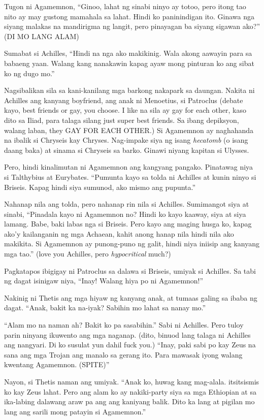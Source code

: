 \documentclass[12pt,letterpaper]{report}
\begin{document}
Tugon ni Agamemnon, ``Ginoo, lahat ng sinabi ninyo ay totoo, pero itong tao nito ay may gustong mamahala sa lahat. Hindi ko paninindigan ito. Ginawa nga siyang malakas na mandirigma ng langit, pero pinayagan ba siyang sigawan ako?'' (DI MO LANG ALAM)

Sumabat si Achilles, ``Hindi na nga ako makikinig. Wala akong aawayin para sa babaeng yaan. Walang kang nanakawin kapag ayaw mong pinturan ko ang sibat ko ng dugo mo.''

Nagsibalikan sila sa kani-kanilang mga barkong nakapark sa daungan. Nakita ni Achilles ang kanyang boyfriend, ang anak ni Menoetius, si Patroclus (debate kayo, best friends or gay, you choose. I like na sila ay gay for each other, kaso dito sa Iliad, para talaga silang just super best friends. Sa ibang depiksyon, walang laban, they GAY FOR EACH OTHER.) Si Agamemnon ay naghahanda na ibalik si Chryseis kay Chryses. Nag-impake siya ng isang \textit{hecatomb} (o isang daang baka) at sinama si Chryseis sa barko. Ginawi niyang kapitan si Ulysses.

Pero, hindi kinalimutan ni Agamemnon ang kangyang pangako. Pinatawag niya si Talthybius at Eurybates. ``Pumunta kayo sa tolda ni Achilles at kunin ninyo si Briseis. Kapag hindi siya sumunod, ako mismo ang pupunta.''

Nahanap nila ang tolda, pero nahanap rin nila si Achilles. Sumimangot siya at sinabi, ``Pinadala kayo ni Agamemnon no? Hindi ko kayo kaaway, siya at siya lamang. Babe, baki labas nga si Briseis. Pero kayo ang maging husga ko, kapag ako'y kailanganin ng mga Achaean, kahit anong hanap nila hindi nila ako makikita. Si Agamemnon ay punong-puno ng galit, hindi niya iniisip ang kanyang mga tao.'' (love you Achilles, pero \textit{hypocritical} much?)

Pagkatapos ibigigay ni Patroclus sa dalawa si Briseis, umiyak si Achilles. Sa tabi ng dagat isinigaw niya, ``Inay! Walang hiya po ni Agamemnon!''

Nakinig ni Thetis ang mga hiyaw ng kanyang anak, at tumaas galing sa ibaba ng dagat. ``Anak, bakit ka na-iyak? Sabihin mo lahat sa nanay mo.''

``Alam mo na naman ah? Bakit ko pa sasabihin.'' Sabi ni Achilles. Pero tuloy parin ninyang ikuwento ang mga naganap. (dito, binuod lang talaga ni Achilles ang nangyari. Di ko susulat yun dahil fuck you.) ``Inay, paki sabi po kay Zeus na sana ang mga Trojan ang manalo sa gerang ito. Para mawasak iyong walang kwentang Agamemnon. (SPITE)''

Nayon, si Thetis naman ang umiyak. ``Anak ko, huwag kang mag-alala. itsitsismis ko kay Zeus lahat. Pero ang alam ko ay nakiki-party siya sa mga Ethiopian at sa ika-labing dalawang araw pa ang ang kaniyang balik. Dito ka lang at pigilan mo lang ang sarili mong patayin si Agamemnon.''
\end{document}
